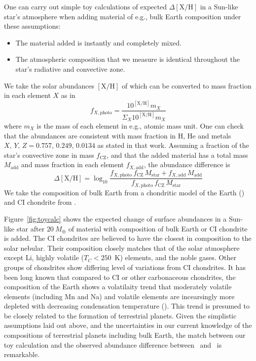 \documentclass[manuscript]{aastex6}
\newcommand*\elem[1]{\ensuremath{\mathrm{#1}}}
\newcommand*\elemH[1]{\ensuremath{[\mathrm{#1}/\elem{H}]}}
\newcommand{\sunanalog}{\text{Krios}}
\newcommand{\bizarreone}{\text{Kronos}}
\newcommand{\Tcondens}{\ensuremath{T_C}}
\newcommand{\mearth}{\ensuremath{M_\oplus}}
\begin{document}
One can carry out simple toy calculations of expected $\Delta\elemH{X}$
in a Sun-like star's atmosphere when adding material of e.g., bulk Earth composition
under these assumptions:
\begin{itemize}
  \item The material added is instantly and completely mixed.
  \item The atmospheric composition that we measure is identical throughout
    the star's radiative and convective zone.
\end{itemize}
We take the solar abundances $\elemH{X}$ of \citealt{Asplund:2009aa}
which can be converted to mass fraction in each element $X$ as in
\begin{equation}
  f_{X,\mathrm{photo}} = \frac{10^{\elemH{X}} m_X}{\Sigma_X 10^{\elemH{X}} m_X}
\end{equation}
where $m_X$ is the mass of each element in e.g., atomic mass unit.
One can check that the \citealt{Asplund:2009aa} abundances
are consistent with mass fraction in \elem{H}, \elem{He} and metals
$X,\,Y,\,Z=0.757,\,0.249,\,0.0134$ as stated in that work.
Assuming a fraction of the star's convective zone in mass $f_\mathrm{CZ}$,
and that the added material has a total mass $M_\mathrm{add}$ and mass fraction in each
element $f_{X,\mathrm{add}}$,
the abundance difference is
\begin{equation}
  \Delta\elemH{X} = \log_{10} \frac{f_{X,\mathrm{photo}}\,f_\mathrm{CZ}\,M_\mathrm{star} + f_{X,\mathrm{add}}\,M_\mathrm{add}}
    {f_{X,\mathrm{photo}}\,f_\mathrm{CZ}\,M_\mathrm{star}}
\end{equation}
We take the composition of bulk Earth from a chondritic model of the Earth
(\citealt{mcdonough2001composition}) and CI chondrite from \citealt{2009LanB...4B...44L}.

Figure~\ref{fig:toycalc} shows the expected change of surface abundances in a
Sun-like star after $20~\mearth$ of material with composition of bulk Earth or
CI chondrite is added.
The CI chondrites are believed to have the closest in composition to the solar nebular.
Their composition closely matches that of the solar atmosphere except
Li, highly volatile ($\Tcondens < 250$~K) elements, and the noble gases.
Other groups of chondrites show differing level of variations from CI chondrites.
It has been long known that compared to CI or other carbonaceous chondrites,
the composition of the Earth shows a volatilaity trend that moderately volatile
elements (including Mn and Na) and volatile elements are incearsingly more
depleted with decreasing condensation temperature (\citealt{mcdonough2001composition}).
This trend is presumed to be closely related to the formation of terrestrial planets.
Given the simplistic assumptions laid out above, and the uncertainties
in our current knowledge of the compositions of terrestrial planets including bulk Earth,
the match between our toy calculation and the observed abundance difference
between \bizarreone\ and \sunanalog\ is remarkable.
\end{document}
